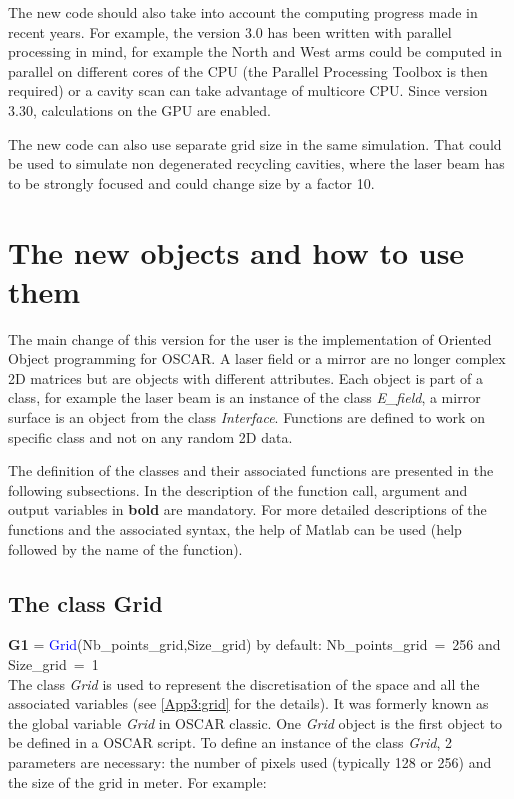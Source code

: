  The new code should also take into account the computing progress made in recent years. For example, the version 3.0 has been written with parallel processing in mind, for example the North and West arms could be computed in parallel on different cores of the CPU (the Parallel Processing Toolbox is then required) or a cavity scan can take advantage of multicore CPU. Since version 3.30, calculations on the GPU are enabled.

 The new code can also use separate grid size in the same simulation. That could be used to simulate non degenerated recycling cavities, where the laser beam has to be strongly focused and could change size by a factor 10.

\section{The new objects and how to use them}

The main change of this version for the user is the implementation of Oriented Object programming for OSCAR. A laser field or a mirror are no longer complex 2D matrices but are objects with different attributes. Each object is part of a class, for example the laser beam is an instance of the class \textsl{E\_field}, a mirror surface is an object from the class \textsl{Interface}. Functions are defined to work on specific class and not on any random 2D data.

The definition of the classes and their associated functions are presented in the following subsections. In the description of the function call, argument and output variables in \textbf{bold} are mandatory. For more detailed descriptions of the functions and the associated syntax, the help of Matlab can be used (help followed by the name of the function).

\subsection{The class Grid}
\textbf{G1} = \textcolor{blue}{Grid}(Nb\_points\_grid,Size\_grid)
by default: Nb\_points\_grid~=~256 and Size\_grid~=~1 \\

The class \textsl{Grid} is used to represent the discretisation of the space and all the associated variables (see \ref{App3:grid} for the details). It was formerly known as the global variable \textsl{Grid} in OSCAR classic. One \textsl{Grid} object is the first object to be defined in a OSCAR script. To define an instance of the class \textsl{Grid}, 2 parameters are necessary: the number of pixels used (typically 128 or 256) and the size of the grid in meter. For example:

